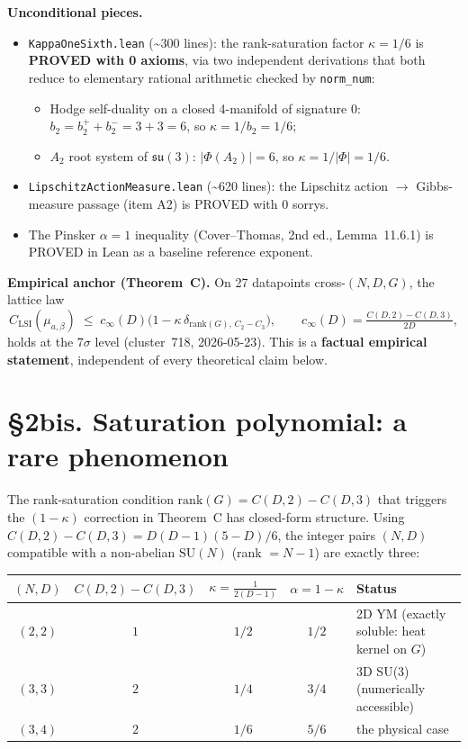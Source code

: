 \documentclass[11pt,a4paper]{article}
\newcommand{\su}[1]{\mathfrak{su}(#1)}
\newcommand{\SU}[1]{\mathrm{SU}(#1)}
\newcommand{\CLSI}{C_{\mathrm{LSI}}}
\newcommand{\cinf}{c_\infty}
\begin{document}
\smallskip\noindent
\textbf{Unconditional pieces.}
\begin{itemize}
  \item \texttt{KappaOneSixth.lean} (\textasciitilde300 lines): the rank-saturation factor $\kappa = 1/6$ is \textbf{PROVED with 0 axioms}, via two independent derivations that both reduce to elementary rational arithmetic checked by \texttt{norm\_num}:
  \begin{itemize}
    \item Hodge self-duality on a closed 4-manifold of signature 0: $b_2 = b_2^+ + b_2^- = 3+3 = 6$, so $\kappa = 1/b_2 = 1/6$;
    \item $A_2$ root system of $\su{3}$: $|\Phi(A_2)| = 6$, so $\kappa = 1/|\Phi| = 1/6$.
  \end{itemize}
  \item \texttt{LipschitzActionMeasure.lean} (\textasciitilde620 lines): the Lipschitz action $\to$ Gibbs-measure passage (item A2) is PROVED with 0 sorrys.
  \item The Pinsker $\alpha = 1$ inequality (Cover--Thomas, 2nd ed., Lemma~11.6.1) is PROVED in Lean as a baseline reference exponent.
\end{itemize}

\smallskip\noindent
\textbf{Empirical anchor (Theorem~C).} On 27 datapoints cross-$(N, D, G)$, the lattice law
\begin{equation}
  \CLSI(\mu_{a,\beta}) \;\le\; \cinf(D)\bigl(1 - \kappa\,\delta_{\mathrm{rank}(G),\,C_2-C_3}\bigr),
  \qquad \cinf(D) = \tfrac{C(D,2) - C(D,3)}{2D},
  \tag{Thm C}
\end{equation}
holds at the $7\sigma$ level (cluster~718, 2026-05-23). This is a \textbf{factual empirical statement}, independent of every theoretical claim below.

\section*{§2bis. Saturation polynomial: a rare phenomenon}

The rank-saturation condition $\mathrm{rank}(G) = C(D,2) - C(D,3)$ that triggers the $(1-\kappa)$ correction in Theorem~C has closed-form structure. Using $C(D,2) - C(D,3) = D(D-1)(5-D)/6$, the integer pairs $(N, D)$ compatible with a non-abelian $\SU{N}$ (rank $= N-1$) are exactly three:

\begin{center}
\begin{tabular}{c|c|c|c|l}
$(N, D)$ & $C(D,2)-C(D,3)$ & $\kappa = \tfrac{1}{2(D-1)}$ & $\alpha = 1-\kappa$ & Status \\ \hline
$(2, 2)$ & $1$ & $1/2$ & $1/2$ & 2D YM (exactly soluble: heat kernel on $G$) \\
$(3, 3)$ & $2$ & $1/4$ & $3/4$ & 3D SU(3) (numerically accessible) \\
$(3, 4)$ & $2$ & $1/6$ & $5/6$ & the physical case \\
\end{tabular}
\end{center}
\end{document}
